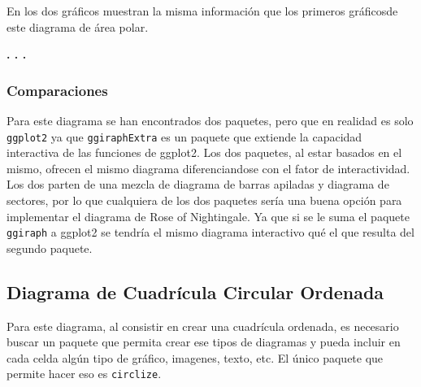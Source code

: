 \documentclass{article}\usepackage[]{graphicx}\usepackage[]{color}
\begin{document}
En los dos gr\'aficos muestran la misma informaci\'on que los primeros gr\'aficosde este diagrama de \'area polar. 
\begin{center}
\textbf{. . .}
\end{center}
\subsubsection{Comparaciones}
Para este diagrama se han encontrados dos paquetes, pero que en realidad es solo \texttt{ggplot2} ya que \texttt{ggiraphExtra} es un paquete que extiende la capacidad interactiva de las funciones de ggplot2. Los dos paquetes, al estar basados en el mismo, ofrecen el mismo diagrama diferenciandose con el fator de interactividad. Los dos parten de una mezcla de diagrama de barras apiladas y diagrama de sectores, por lo que cualquiera de los dos paquetes ser\'ia una buena opci\'on para implementar el diagrama de Rose of Nightingale. Ya que si se le suma el paquete \texttt{ggiraph} a ggplot2 se tendr\'ia el mismo diagrama interactivo qu\'e el que resulta del segundo paquete.
\clearpage
\subsection{Diagrama de Cuadr\'icula Circular Ordenada}\label{ssec:ord}
Para este diagrama, al consistir en crear una cuadr\'icula ordenada, es necesario buscar un paquete que permita crear ese tipos de diagramas y pueda incluir en cada celda alg\'un tipo de gr\'afico, imagenes, texto, etc. El \'unico paquete que permite hacer eso es \texttt{circlize}.
\end{document}
